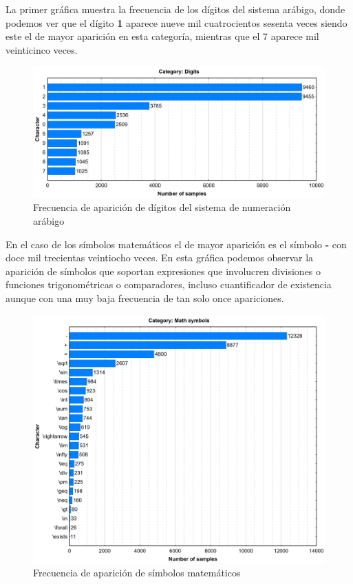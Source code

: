 La primer gráfica muestra la frecuencia de los dígitos del sistema arábigo, donde podemos ver que el dígito \textbf{1} aparece nueve mil cuatrocientos sesenta veces siendo este el de mayor aparición en esta categoría, mientras que el 7 aparece mil veinticinco veces.
\begin{figure}[H]
	\centering
	\includegraphics[width=1\textwidth]{capitulo3/imgs/digits_distribution.png}
	\caption{Frecuencia de aparición de dígitos del sistema de numeración arábigo \cite{EXTRACTOR}}
	\label{fig:DigDist}
\end{figure}
\newpage
En el caso de los símbolos matemáticos el de mayor aparición es el símbolo \textbf{-} con doce mil trecientas veintiocho veces. En esta gráfica podemos observar la aparición de símbolos que soportan expresiones que involucren divisiones o funciones trigonométricas o comparadores, incluso cuantificador de existencia aunque con una muy baja frecuencia de tan solo once apariciones.
\begin{figure}[H]
	\centering
	\includegraphics[width=1\textwidth]{capitulo3/imgs/math_symbols_distribution.png}
	\caption{Frecuencia de aparición de símbolos matemáticos \cite{EXTRACTOR}}
	\label{fig:MathSymbols}
\end{figure}
\newpage

